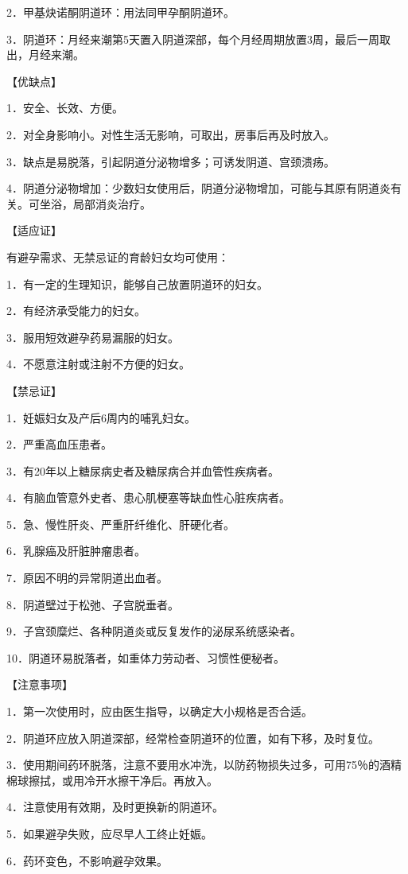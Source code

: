 \documentclass[12pt,UTF8]{ctexbook}
\begin{document}
2．甲基炔诺酮阴道环：用法同甲孕酮阴道环。

3．阴道环：月经来潮第5天置入阴道深部，每个月经周期放置3周，最后一周取出，月经来潮。

【优缺点】

1．安全、长效、方便。

2．对全身影响小。对性生活无影响，可取出，房事后再及时放入。

3．缺点是易脱落，引起阴道分泌物增多；可诱发阴道、宫颈溃疡。

4．阴道分泌物增加：少数妇女使用后，阴道分泌物增加，可能与其原有阴道炎有关。可坐浴，局部消炎治疗。

【适应证】

有避孕需求、无禁忌证的育龄妇女均可使用：

1．有一定的生理知识，能够自己放置阴道环的妇女。

2．有经济承受能力的妇女。

3．服用短效避孕药易漏服的妇女。

4．不愿意注射或注射不方便的妇女。

【禁忌证】

1．妊娠妇女及产后6周内的哺乳妇女。

2．严重高血压患者。

3．有20年以上糖尿病史者及糖尿病合并血管性疾病者。

4．有脑血管意外史者、患心肌梗塞等缺血性心脏疾病者。

5．急、慢性肝炎、严重肝纤维化、肝硬化者。

6．乳腺癌及肝脏肿瘤患者。

7．原因不明的异常阴道出血者。

8．阴道壁过于松弛、子宫脱垂者。

9．子宫颈糜烂、各种阴道炎或反复发作的泌尿系统感染者。

10．阴道环易脱落者，如重体力劳动者、习惯性便秘者。

【注意事项】

1．第一次使用时，应由医生指导，以确定大小规格是否合适。

2．阴道环应放入阴道深部，经常检查阴道环的位置，如有下移，及时复位。

3．使用期间药环脱落，注意不要用水冲洗，以防药物损失过多，可用75％的酒精棉球擦拭，或用冷开水擦干净后。再放入。

4．注意使用有效期，及时更换新的阴道环。

5．如果避孕失败，应尽早人工终止妊娠。

6．药环变色，不影响避孕效果。
\end{document}

